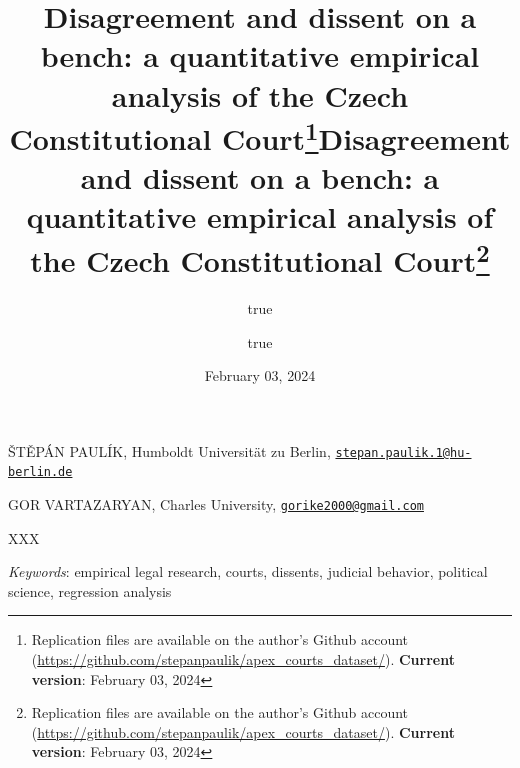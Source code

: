\documentclass[
  11pt,
]{article}
\title{Disagreement and dissent on a bench: a quantitative empirical
analysis of the Czech Constitutional Court\thanks{Replication files are
available on the author's Github account
(\url{https://github.com/stepanpaulik/apex_courts_dataset/}).
\textbf{Current version}: February 03, 2024}}
\author{true \and true}
\date{February 03, 2024}
\title{Disagreement and dissent on a bench: a quantitative empirical
analysis of the Czech Constitutional Court\thanks{Replication files are
available on the author's Github account
(\url{https://github.com/stepanpaulik/apex_courts_dataset/}).
\textbf{Current version}: February 03, 2024}  }
\date{}
\renewenvironment{abstract}
 {{%
    \setlength{\leftmargin}{0mm}
    \setlength{\rightmargin}{\leftmargin}%
  }%
  \relax}
 {\endlist}
\begin{document}



{%
\setlength{\parindent}{0pt}
\thispagestyle{plain}
{%
\maketitle  %

}




{
   \vskip 13.5pt\relax \normalsize\fontsize{11}{12}
   \MakeUppercase{Štěpán Paulík}, \small{Humboldt Universität zu Berlin,
\href{mailto:stepan.paulik.1@hu-berlin.de}{\nolinkurl{stepan.paulik.1@hu-berlin.de}}}   \par \vskip -3.5pt \MakeUppercase{Gor
Vartazaryan}, \small{Charles University,
\href{mailto:gorike2000@gmail.com}{\nolinkurl{gorike2000@gmail.com}}}   

}

}








\begin{abstract}


    \vskip 8.5pt %

\noindent \small{XXX}


\vskip 8.5pt \noindent \emph{Keywords}: empirical legal research,
courts, dissents, judicial behavior, political science, regression
analysis \par




\end{abstract}


\vskip -8.5pt

{
\hypersetup{linkcolor=black}
\setcounter{tocdepth}{2}
\tableofcontents
}


{
\setcounter{tocdepth}{2}
\tableofcontents
}

\setlength{\parindent}{16pt}
\setlength{\parskip}{0pt}
\end{document}
